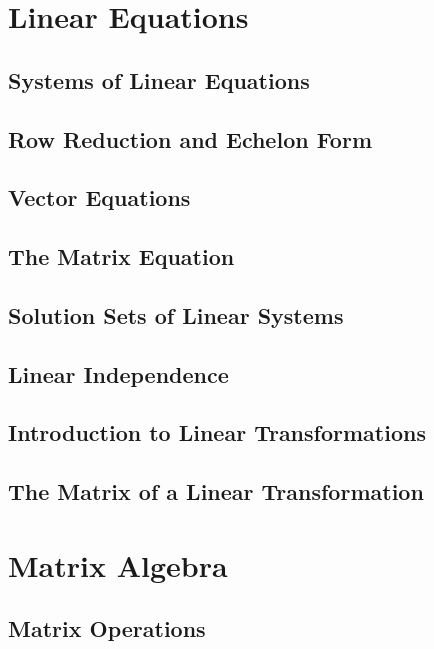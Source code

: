 \documentclass{package/notes}
\begin{document}
\chapter{Linear Equations}

\section{Systems of Linear Equations}

\section{Row Reduction and Echelon Form}

\section{Vector Equations}

\section{The Matrix Equation}

\section{Solution Sets of Linear Systems}

\section{Linear Independence}

\section{Introduction to Linear Transformations}

\section{The Matrix of a Linear Transformation}



\chapter{Matrix Algebra}

\section{Matrix Operations}
\end{document}
